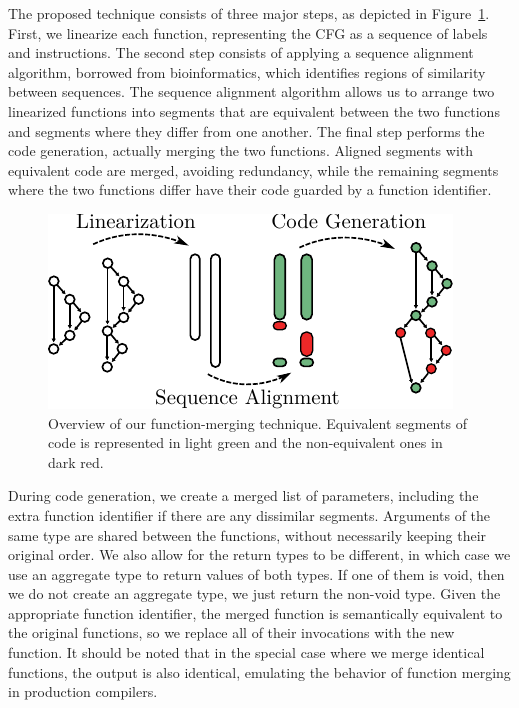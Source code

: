 \documentclass[10pt,twocolumn,nocopyrightspace]{sigplanconf}
\begin{document}
The proposed technique consists of three major steps, as depicted in
Figure~\ref{fig:func-merge-overview}.
First, we linearize each function, representing the CFG as a sequence of
labels and instructions.
The second step consists of applying a sequence alignment algorithm, borrowed
from bioinformatics, which identifies regions of similarity between sequences.
The sequence alignment algorithm allows us to arrange two linearized functions
into segments that are equivalent between the two functions and segments where
they differ from one another.
The final step performs the code generation, actually merging the two functions.
Aligned segments with equivalent code are merged, avoiding redundancy,
while the remaining segments where the two functions differ have their code
guarded by a function identifier.

\begin{figure}[t!]
  \centering
  \includegraphics[width=0.85\linewidth]{figs/func-merge-overview.pdf}
  \caption{Overview of our function-merging technique.
           Equivalent segments of code is represented in light green and the non-equivalent ones in dark red.}
  \vspace{-3em}
  \label{fig:func-merge-overview}
\end{figure}

During code generation, we create a merged list of parameters, including the
extra function identifier if there are any dissimilar segments. 
Arguments of the same type are shared between the functions, without necessarily
keeping their original order.
We also allow for the return types to be different, in which case we use an
aggregate type to return values of both types.
If one of them is void, then we do not create an aggregate type, we just return the non-void type.
Given the appropriate function identifier, the merged function is semantically equivalent to the original functions,
so we replace all of their invocations with the new function.
It should be noted that in the special case where we merge identical functions, the output is also identical, emulating
the behavior of function merging in production compilers.
\end{document}

